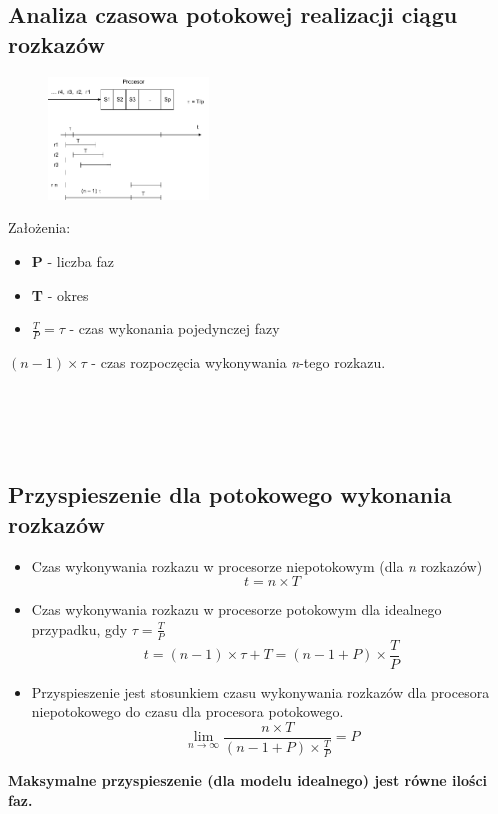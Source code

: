 	\newpage
   	\subsection{Analiza czasowa potokowej realizacji ciągu rozkazów}
	   	\begin{figure}
	   		\includegraphics[width=0.38\textwidth]{./images/potok03}
	   	\end{figure}
   		Założenia:
	   	\begin{itemize}
	   		\item \textbf{P} - liczba faz
	   		\item \textbf{T} - okres
	   		\item $\frac{T}{P}=\tau $ - czas wykonania pojedynczej fazy
	   	\end{itemize}
   		$(n-1)\times\tau$ - czas rozpoczęcia wykonywania \emph{n}-tego rozkazu.\\\\\\\\\\
   	\subsection{Przyspieszenie dla potokowego wykonania rozkazów}
	   	\begin{itemize}
	   		\item Czas wykonywania rozkazu w procesorze niepotokowym (dla \emph{n} rozkazów)
	   		$$t=n\times T$$
	   		\item Czas wykonywania rozkazu w procesorze potokowym dla idealnego przypadku, gdy $\tau=\frac{T}{P}$\\
	   		$$t=(n-1)\times\tau+T=(n-1+P)\times\frac{T}{P}$$
	   		\item Przyspieszenie jest stosunkiem czasu wykonywania rozkazów dla procesora niepotokowego do czasu dla procesora potokowego.
	   		$$\lim_{n \to \infty}\frac{n\times T}{(n-1+P)\times\frac{T}{P}}=P$$
	   	\end{itemize}
	   \textbf{	Maksymalne przyspieszenie (dla modelu idealnego) jest równe ilości faz.}
